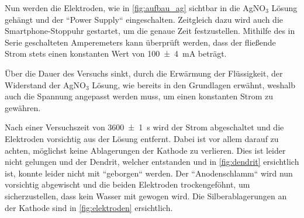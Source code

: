 \documentclass[11pt,ngerman]{scrartcl}
\begin{document}
Nun werden die Elektroden, wie in \autoref{fig:aufbau_ag} sichtbar in die AgNO$_3$ Lösung gehängt und der ``Power Supply`` eingeschalten. Zeitgleich dazu wird auch die Smartphone-Stoppuhr gestartet, um die genaue Zeit festzustellen. Mithilfe des in Serie geschalteten Amperemeters kann überprüft werden, dass der fließende Strom stets einen konstanten Wert von \SI{100(4)}{mA} beträgt.

Über die Dauer des Versuchs sinkt, durch die Erwärmung der Flüssigkeit, der Widerstand der AgNO$_3$ Lösung, wie bereits in den Grundlagen erwähnt, weshalb auch die Spannung angepasst werden muss, um einen konstanten Strom zu gewähren.

\vspace{2mm}

Nach einer Versuchszeit von \SI{3600(1)}{\s} wird der Strom abgeschaltet und die Elektroden vorsichtig aus der Lösung entfernt. Dabei ist vor allem darauf zu achten, möglichst keine Ablagerungen der Kathode zu verlieren. Dies ist leider nicht gelungen und der Dendrit, welcher entstanden und in \autoref{fig:dendrit} ersichtlich ist, konnte leider nicht mit ``geborgen`` werden. Der ``Anodenschlamm`` wird nun vorsichtig abgewischt und die beiden Elektroden trockengeföhnt, um sicherzustellen, dass kein Wasser mit gewogen wird. Die Silberablagerungen an der Kathode sind in \autoref{fig:elektroden} ersichtlich.
\end{document}
